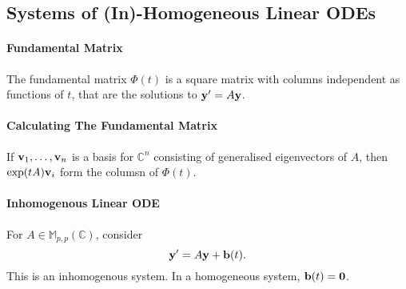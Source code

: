 \subsection{Systems of (In)-Homogeneous Linear ODEs}

\paragraph{Fundamental Matrix}
The fundamental matrix \( \Phi(t) \) is a square matrix with
columns independent as functions of \( t \), that are the
solutions to \( \mathbf{y}' = A \mathbf{y} \).

\paragraph{Calculating The Fundamental Matrix}
If \( \mathbf{v}_1, \dots, \mathbf{v}_n \) is a basis for \( \mathbb{C}^n \)
consisting of generalised eigenvectors of \( A \), then
\( \exp(t A) \mathbf{v}_i \) form the columsn of \( \Phi(t) \).

\paragraph{Inhomogenous Linear ODE}
For \( A \in \mathbb{M}_{p, p}(\mathbb{C}) \), consider \[
    \mathbf{y}' = A \mathbf{y} + \mathbf{b}(t)
.\] This is an inhomogenous system. In a homogeneous system,
\( \mathbf{b}(t) = \mathbf{0} \).



